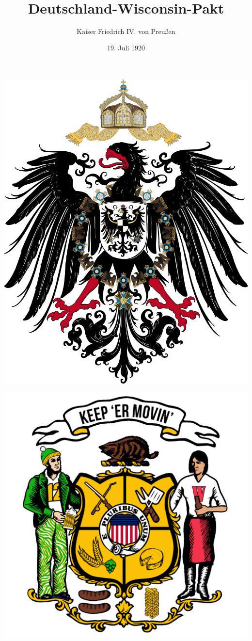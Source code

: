 \documentclass{article}
\title{Deutschland-Wisconsin-Pakt}
\author{Kaiser Friedrich IV. von Preußen}
\date{19. Juli 1920}
\begin{document}
\maketitle
\begin{center}
    \begin{minipage}{0.45\textwidth}
        \centering
        \includegraphics[scale=.15]{dr_wappen}
    \end{minipage}
    \hfill
    \begin{minipage}{0.45\textwidth}
        \centering
        \includegraphics[scale=.10]{wi_wappen.png}

\end{minipage}
\end{center}
\end{document}
